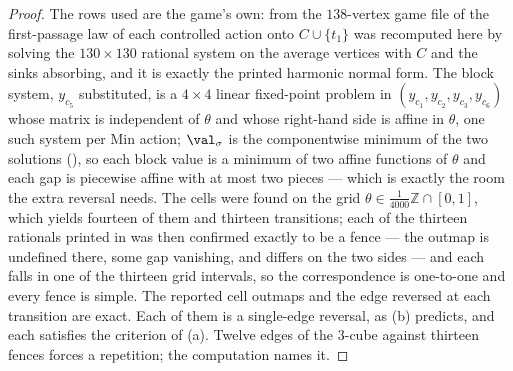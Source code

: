 \begin{proof}
The rows used are the game's own: from the $138$-vertex game file of
 the first-passage law of each controlled action onto
$C\cup\{t_1\}$ was recomputed here by solving the $130\times130$ rational
system on the average vertices with $C$ and the sinks absorbing, and it is
exactly the printed harmonic normal form.
The block system, $y_{c_5}$ substituted, is a $4\times4$ linear fixed-point
problem in $(y_{c_1},y_{c_2},y_{c_3},y_{c_6})$ whose matrix is independent of
$\theta$ and whose right-hand side is affine in $\theta$, one such system per
Min action; $\val_\sigma$ is the componentwise minimum of the two solutions
(), so each block value is a minimum of two affine
functions of $\theta$ and each gap is piecewise affine with at most two
pieces --- which is exactly the room the extra reversal needs. The cells were
found on the grid $\theta\in\frac1{4000}\mathbb Z\cap[0,1]$, which yields
fourteen of them and thirteen transitions; each of the thirteen rationals
printed in  was then confirmed exactly to be a fence
--- the outmap is undefined there, some gap vanishing, and differs on the two
sides --- and each falls in one of the thirteen grid intervals, so the
correspondence is one-to-one and every fence is simple. The reported cell
outmaps and the edge reversed at each transition are exact. Each of them is a
single-edge reversal, as (b) predicts, and each satisfies the
criterion of (a). Twelve edges of the $3$-cube against thirteen
fences forces a repetition; the computation names it.
\end{proof}


